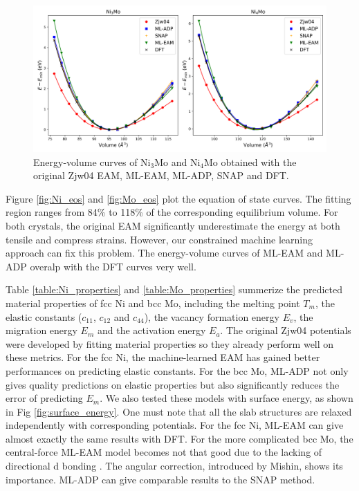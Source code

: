 \documentclass[prb,reprint,superscriptaddress]{revtex4-2}
\begin{document}
% 
%
\begin{figure}
\centering
\includegraphics[scale=0.5]{alloy_eos.png}
\caption{\label{fig:alloy_eos} Energy-volume curves of Ni$_3$Mo and Ni$_4$Mo 
obtained with the original Zjw04 EAM, ML-EAM, ML-ADP, SNAP and DFT.}
\end{figure}

Figure \ref{fig:Ni_eos} and \ref{fig:Mo_eos} plot the equation of state 
curves. The fitting region ranges from 84\% to 118\% of the corresponding 
equilibrium volume. For both crystals, the original EAM significantly 
underestimate the energy at both tensile and compress strains. However, our 
constrained machine learning approach can fix this problem. The 
energy-volume curves of ML-EAM and ML-ADP overalp with the DFT curves very well. 

Table \ref{table:Ni_properties} and \ref{table:Mo_properties} summerize the 
predicted material properties of fcc Ni and bcc Mo, including the melting point 
$T_{m}$, the elastic constants ($c_{11}$, $c_{12}$ and $c_{44}$), the vacancy 
formation energy $E_{v}$, the migration energy $E_{m}$ and the activation energy 
$E_{a}$. The original Zjw04 potentials were developed by fitting material 
properties so they already perform well on these metrics. For the fcc Ni, the 
machine-learned EAM has gained better performances on predicting elastic 
constants. For the bcc Mo, ML-ADP not only gives quality predictions on elastic 
properties but also significantly reduces the error of predicting $E_m$. We also 
tested these models with surface energy, as shown in Fig 
\ref{fig:surface_energy}. One must note that all the slab structures are relaxed 
independently with corresponding potentials. For the fcc Ni, ML-EAM can give 
almost exactly the same results with DFT. For the more complicated bcc Mo, the 
central-force ML-EAM model becomes not that good due to the lacking of 
directional d bonding \cite{ADP0}. The angular correction, introduced by Mishin, 
shows its importance. ML-ADP can give comparable results to the SNAP method.
\end{document}

